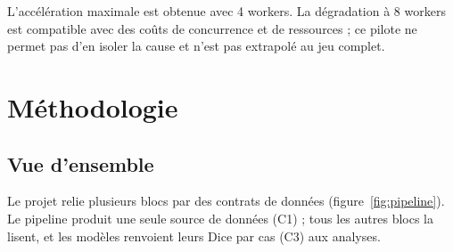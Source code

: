 \documentclass[11pt,a4paper]{report}
\begin{document}
L'accélération maximale est obtenue avec 4 workers. La dégradation à 8 workers
est compatible avec des coûts de concurrence et de ressources ; ce pilote ne
permet pas d'en isoler la cause et n'est pas extrapolé au jeu complet.

\chapter{Méthodologie}
\label{chap:methodo}

\section{Vue d'ensemble}

Le projet relie plusieurs blocs par des contrats de données
(figure~\ref{fig:pipeline}). Le pipeline produit une seule source de données
(C1) ; tous les autres blocs la lisent, et les modèles renvoient leurs Dice
par cas (C3) aux analyses.
\end{document}
